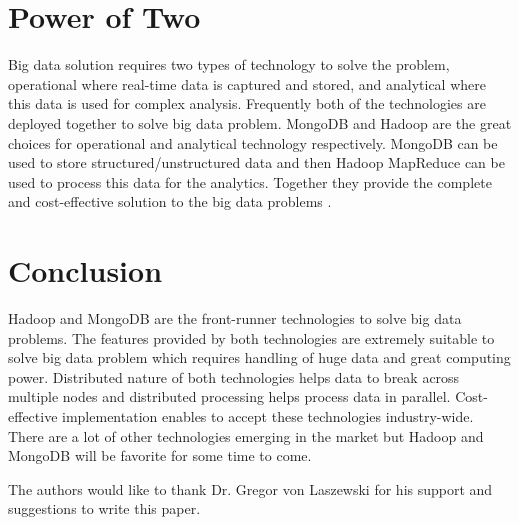 \documentclass[sigconf]{acmart}
\begin{document}
\section{Power of Two}
Big data solution requires two types of technology to solve the problem, operational where real-time data is captured and stored, and analytical where this data is used for complex analysis. Frequently both of the technologies are deployed together to solve big data problem. MongoDB and Hadoop are the great choices for operational and analytical technology respectively. MongoDB can be used to store structured/unstructured data and then Hadoop MapReduce can be used to process this data for the analytics. Together they provide the complete and cost-effective solution to the big data problems \cite{www-mongo-bigdata}.

\section{Conclusion}
Hadoop and MongoDB are the front-runner technologies to solve big data problems. The features provided by both technologies are extremely suitable to solve big data problem which requires handling of huge data and great computing power. Distributed nature of both technologies helps data to break across multiple nodes and distributed processing helps process data in parallel. Cost-effective implementation enables to accept these technologies industry-wide. There are a lot of other technologies emerging in the market but Hadoop and MongoDB will be favorite for some time to come.

\begin{acks}

  The authors would like to thank Dr. Gregor von Laszewski for his
  support and suggestions to write this paper.

\end{acks}


 
\end{document}
